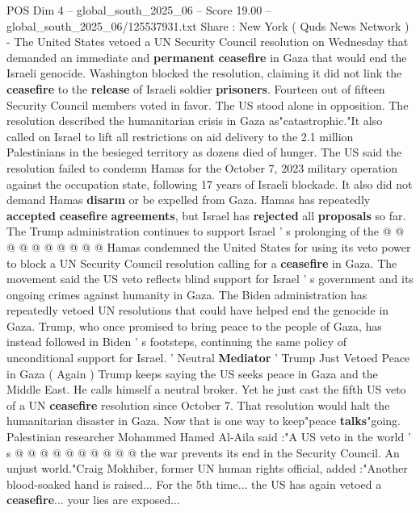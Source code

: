 \begin{textsample}{POS Dim 4 – global\_south\_2025\_06 – Score 19.00 – global\_south\_2025\_06/125537931.txt}  \label{ex:f4_pos_355}
Share : New York ( Quds News Network ) - The United States vetoed a UN Security Council resolution on Wednesday that demanded an immediate and \textbf{permanent} \textbf{ceasefire} in Gaza that would end the Israeli genocide.
Washington blocked the resolution, claiming it did not link the \textbf{ceasefire} to the \textbf{release} of Israeli soldier \textbf{prisoners}.
Fourteen out of fifteen Security Council members voted in favor.
The US stood alone in opposition.
The resolution described the humanitarian crisis in Gaza as"catastrophic."It also called on Israel to lift all restrictions on aid delivery to the 2.1 million Palestinians in the besieged territory as dozens died of hunger.
The US said the resolution failed to condemn Hamas for the October 7, 2023 military operation against the occupation state, following 17 years of Israeli blockade.
It also did not demand Hamas \textbf{disarm} or be expelled from Gaza.
Hamas has repeatedly \textbf{accepted} \textbf{ceasefire} \textbf{agreements}, but Israel has \textbf{rejected} all \textbf{proposals} so far.
The Trump administration continues to support Israel ' s prolonging of the @ @ @ @ @ @ @ @ @ @ Hamas condemned the United States for using its veto power to block a UN Security Council resolution calling for a \textbf{ceasefire} in Gaza.
The movement said the US veto reflects blind support for Israel ' s government and its ongoing crimes against humanity in Gaza.
The Biden administration has repeatedly vetoed UN resolutions that could have helped end the genocide in Gaza.
Trump, who once promised to bring peace to the people of Gaza, has instead followed in Biden ' s footsteps, continuing the same policy of unconditional support for Israel. ' Neutral \textbf{Mediator} ' Trump Just Vetoed Peace in Gaza ( Again ) Trump keeps saying the US seeks peace in Gaza and the Middle East.
He calls himself a neutral broker.
Yet he just cast the fifth US veto of a UN \textbf{ceasefire} resolution since October 7.
That resolution would halt the humanitarian disaster in Gaza.
Now that is one way to keep"peace \textbf{talks}"going.
Palestinian researcher Mohammed Hamed Al-Aila said :"A US veto in the world ' s @ @ @ @ @ @ @ @ @ @ the war prevents its end in the Security Council.
An unjust world."Craig Mokhiber, former UN human rights official, added :"Another blood-soaked hand is raised...
For the 5th time... the US has again vetoed a \textbf{ceasefire}... your lies are exposed...

\end{textsample}
